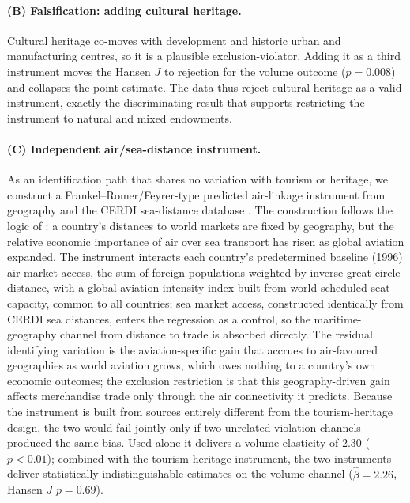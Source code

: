 \paragraph{(B) Falsification: adding cultural heritage.} Cultural heritage
co-moves with development and historic urban and manufacturing centres, so it
is a plausible exclusion-violator. Adding it as a third instrument moves the
Hansen $J$ to rejection for the volume outcome ($p=0.008$) and collapses the
point estimate. The data thus reject cultural heritage as a valid
instrument, exactly the discriminating result that supports restricting the
instrument to natural and mixed endowments.

\paragraph{(C) Independent air/sea-distance instrument.} As an identification
path that shares no variation with tourism or heritage, we construct a
Frankel--Romer/Feyrer-type predicted air-linkage instrument from geography and
the CERDI sea-distance database
\citep{Frankel_1999,Feyrer_2019,Bertoli_2016}. The construction follows the
logic of \citet{Feyrer_2019}: a country's distances to world markets are
fixed by geography, but the relative economic importance of air over sea
transport has risen as global aviation expanded. The instrument interacts
each country's predetermined baseline (1996) air market access, the sum of
foreign populations weighted by inverse great-circle distance, with a global
aviation-intensity index built from world scheduled seat capacity, common to
all countries; sea market access, constructed identically from CERDI
sea distances, enters the regression as a control, so the maritime-geography
channel from distance to trade is absorbed directly. The residual
identifying variation is the aviation-specific gain that accrues to
air-favoured geographies as world aviation grows, which owes nothing to a
country's own economic outcomes; the exclusion restriction is that this
geography-driven gain affects merchandise trade only through the air
connectivity it predicts. Because the instrument is built from
sources entirely different from the tourism-heritage design, the two would
fail jointly only if two unrelated violation channels produced the same bias.
Used alone it delivers a volume elasticity of $2.30$ ($p<0.01$); combined with the tourism-heritage instrument, the two instruments deliver statistically indistinguishable estimates on the volume channel ($\hat\beta=2.26$, Hansen $J$ $p=0.69$).

